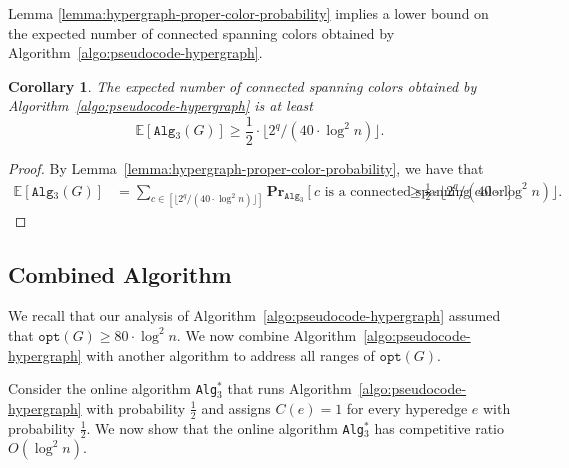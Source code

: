 \documentclass[11pt]{article}
\newtheorem{corollary}{Corollary}
\theoremstyle{definition}
\newcommand{\opt}{\texttt{opt}}
\begin{document}
Lemma \ref{lemma:hypergraph-proper-color-probability} implies a lower bound on the expected number of connected spanning colors obtained by Algorithm~\ref{algo:pseudocode-hypergraph}.

\begin{corollary}\label{corollary:number-proper-colors-hyperedge}
    The expected number of connected spanning colors obtained by Algorithm~\ref{algo:pseudocode-hypergraph} is at least $$\mathbb{E}[\texttt{Alg$_3$}(G)]\geq \frac{1}{2}\cdot \lfloor 2^q/(40\cdot \log ^2n) \rfloor.$$
\end{corollary}
\begin{proof}
By Lemma~\ref{lemma:hypergraph-proper-color-probability}, we have that 
    $$\begin{aligned}
        \mathbb{E}[\texttt{Alg$_3$}(G)] &= \sum_{c\in [\lfloor 2^q/ (40\cdot \log^2 n)\rfloor]} \mathbf{Pr}_{\texttt{Alg$_3$} }[c \text{ is a connected spanning color}] 
&\ge \frac{1}{2}\cdot \lfloor 2^q/ (40\cdot \log^2 n)\rfloor.
    \end{aligned}$$
\end{proof}

\subsection{Combined Algorithm}\label{subsection:mixed-algorithm-hypergraph}
We recall that our analysis of Algorithm~\ref{algo:pseudocode-hypergraph} assumed that $\opt(G)\geq 80\cdot \log^2 n$. We now combine Algorithm~\ref{algo:pseudocode-hypergraph} with another algorithm to address all ranges of $\opt(G)$.

Consider the online algorithm \texttt{Alg$_3^*$} that runs Algorithm~\ref{algo:pseudocode-hypergraph} with probability $\frac{1}{2}$ and assigns $C(e)=1$ for every hyperedge $e$ with probability $\frac{1}{2}$. We now show that the online algorithm \texttt{Alg$_3^*$} has competitive ratio $O(\log^2 n)$.
\end{document}
